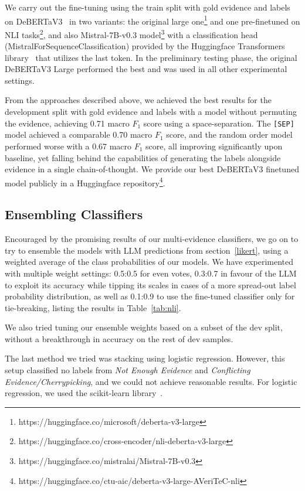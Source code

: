 We carry out the fine-tuning using the \averitec{} train split with gold evidence and labels on DeBERTaV3~\cite{he2023debertav3improvingdebertausing} in two variants: the original large one\footnote{https://huggingface.co/microsoft/deberta-v3-large} and one pre-finetuned on NLI tasks\footnote{https://huggingface.co/cross-encoder/nli-deberta-v3-large}, and also Mistral-7B-v0.3 model\footnote{https://huggingface.co/mistralai/Mistral-7B-v0.3} with a classification head (MistralForSequenceClassification) provided by the Huggingface Transformers library~\cite{wolf-etal-2020-transformers} that utilizes the last token. In the preliminary testing phase, the original DeBERTaV3 Large performed the best and was used in all other experimental settings.

From the approaches described above, we achieved the best results for the development split with gold evidence and labels with a model without permuting the evidence, achieving 0.71 macro $F_1$ score using a space-separation. The \texttt{[SEP]} model achieved a comparable 0.70 macro $F_1$ score, and the random order model performed worse with a 0.67 macro $F_1$ score, all improving significantly upon baseline, yet falling behind the capabilities of generating the labels alongside evidence in a single chain-of-thought. 
We provide our best DeBERTaV3 finetuned model publicly in a Huggingface repository\footnote{https://huggingface.co/ctu-aic/deberta-v3-large-AVeriTeC-nli}.

\subsection{Ensembling Classifiers}
\label{subsubsec:ensembling}

Encouraged by the promising results of our multi-evidence classifiers, we go on to try to ensemble the models with LLM predictions from section~\ref{likert}, using a weighted average of the class probabilities of our models.
We have experimented with multiple weight settings: 0.5:0.5 for even votes, 0.3:0.7 in favour of the LLM to exploit its accuracy while tipping its scales in cases of a more spread-out label probability distribution, as well as 0.1:0.9 to use the fine-tuned classifier only for tie-breaking, listing the results in Table~\ref{tab:nli}.

We also tried tuning our ensemble weights based on a subset of the dev split, without a breakthrough in accuracy on the rest of dev samples.

The last method we tried was stacking using logistic regression. However, this setup classified no labels from \textit{Not Enough Evidence} and \textit{Conflicting Evidence/Cherrypicking}, and we could not achieve reasonable results. For logistic regression, we used the scikit-learn library~\cite{scikit-learn}.

